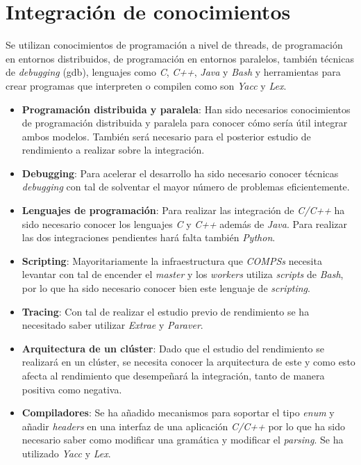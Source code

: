 \section{Integración de conocimientos}

Se utilizan conocimientos de programación a nivel de threads, de programación en entornos distribuidos, de programación en entornos paralelos, también técnicas de \textit{debugging} (gdb), lenguajes como \textit{C}, \textit{C++}, \textit{Java} y \textit{Bash} y herramientas para crear programas que interpreten o compilen como son \textit{Yacc} y \textit{Lex}.

\begin{itemize}
 \item \textbf{Programación distribuida y paralela}: Han sido necesarios conocimientos de programación distribuida y paralela para conocer cómo sería útil integrar ambos modelos. También será necesario para el posterior estudio de rendimiento a realizar sobre la integración.
 \item \textbf{Debugging}: Para acelerar el desarrollo ha sido necesario conocer técnicas \textit{debugging} con tal de solventar el mayor número de problemas eficientemente.
 \item \textbf{Lenguajes de programación}: Para realizar las integración de \textit{C/C++} ha sido necesario conocer los lenguajes \textit{C} y \textit{C++} además de \textit{Java}. Para realizar las dos integraciones pendientes hará falta también \textit{Python}.
 \item \textbf{Scripting}: Mayoritariamente la infraestructura que \textit{COMPSs} necesita levantar con tal de encender el \textit{master} y los \textit{workers} utiliza \textit{scripts} de \textit{Bash}, por lo que ha sido necesario conocer bien este lenguaje de \textit{scripting}.
 \item \textbf{Tracing}: Con tal de realizar el estudio previo de rendimiento se ha necesitado saber utilizar \textit{Extrae} y \textit{Paraver}.
 \item \textbf{Arquitectura de un clúster}: Dado que el estudio del rendimiento se realizará en un clúster, se necesita conocer la arquitectura de este y como esto afecta al rendimiento que desempeñará la integración, tanto de manera positiva como negativa.
 \item \textbf{Compiladores}: Se ha añadido mecanismos para soportar el tipo \textit{enum} y añadir \textit{headers} en una interfaz de una aplicación \textit{C/C++} por lo que ha sido necesario saber como modificar una gramática y modificar el \textit{parsing}. Se ha utilizado \textit{Yacc} y \textit{Lex}.
\end{itemize}


